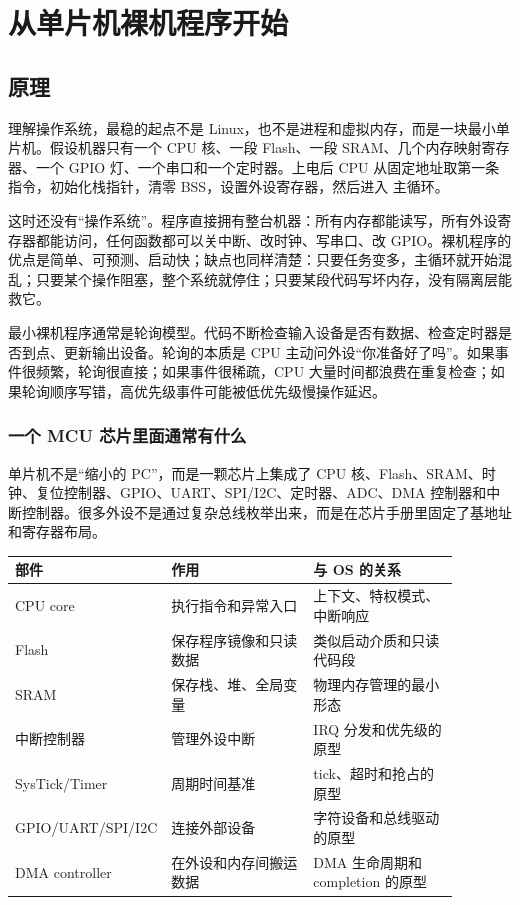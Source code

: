 \chapter{从单片机裸机程序开始}

\section{原理}

理解操作系统，最稳的起点不是 Linux，也不是进程和虚拟内存，而是一块最小单片机。假设机器只有一个 CPU 核、一段 Flash、一段 SRAM、几个内存映射寄存器、一个 GPIO 灯、一个串口和一个定时器。上电后 CPU 从固定地址取第一条指令，初始化栈指针，清零 BSS，设置外设寄存器，然后进入  主循环。

这时还没有“操作系统”。程序直接拥有整台机器：所有内存都能读写，所有外设寄存器都能访问，任何函数都可以关中断、改时钟、写串口、改 GPIO。裸机程序的优点是简单、可预测、启动快；缺点也同样清楚：只要任务变多，主循环就开始混乱；只要某个操作阻塞，整个系统就停住；只要某段代码写坏内存，没有隔离层能救它。

最小裸机程序通常是轮询模型。代码不断检查输入设备是否有数据、检查定时器是否到点、更新输出设备。轮询的本质是 CPU 主动问外设“你准备好了吗”。如果事件很频繁，轮询很直接；如果事件很稀疏，CPU 大量时间都浪费在重复检查；如果轮询顺序写错，高优先级事件可能被低优先级慢操作延迟。

\subsection{一个 MCU 芯片里面通常有什么}

单片机不是“缩小的 PC”，而是一颗芯片上集成了 CPU 核、Flash、SRAM、时钟、复位控制器、GPIO、UART、SPI/I2C、定时器、ADC、DMA 控制器和中断控制器。很多外设不是通过复杂总线枚举出来，而是在芯片手册里固定了基地址和寄存器布局。

\begin{longtable}{p{0.2\linewidth}p{0.34\linewidth}p{0.34\linewidth}}
\toprule
部件 & 作用 & 与 OS 的关系 \\
\midrule
CPU core & 执行指令和异常入口 & 上下文、特权模式、中断响应 \\
Flash & 保存程序镜像和只读数据 & 类似启动介质和只读代码段 \\
SRAM & 保存栈、堆、全局变量 & 物理内存管理的最小形态 \\
中断控制器 & 管理外设中断 & IRQ 分发和优先级的原型 \\
SysTick/Timer & 周期时间基准 & tick、超时和抢占的原型 \\
GPIO/UART/SPI/I2C & 连接外部设备 & 字符设备和总线驱动的原型 \\
DMA controller & 在外设和内存间搬运数据 & DMA 生命周期和 completion 的原型 \\
\bottomrule
\end{longtable}

